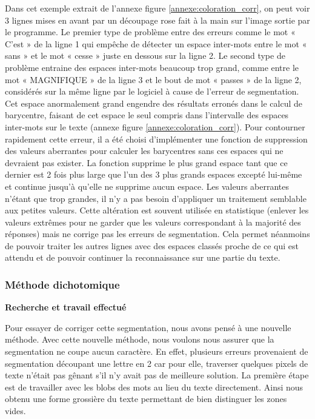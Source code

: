 \documentclass[12pt,a4paper]{article}
\begin{document}
Dans cet exemple extrait de l’annexe figure \ref{annexe:coloration_corr}, on peut voir 3 lignes mises en avant par un découpage rose fait à la main sur l’image sortie par le programme.\bigbreak
Le premier type de problème entre des erreurs comme le mot « C’est » de la ligne 1 qui empêche de détecter un espace inter-mots entre le mot « sans » et le mot « cesse » juste en dessous sur la ligne 2.\bigbreak
Le second type de problème entraine des espaces inter-mots beaucoup trop grand, comme entre le mot « MAGNIFIQUE » de la ligne 3 et le bout de mot « passes » de la ligne 2, considérés sur la même ligne par le logiciel à cause de l’erreur de segmentation.\bigbreak
Cet espace anormalement grand engendre des résultats erronés dans le calcul de barycentre, faisant de cet espace le seul compris dans l’intervalle des espaces inter-mots sur le texte (annexe figure \ref{annexe:coloration_corr}). Pour contourner rapidement cette erreur, il a été choisi d’implémenter une fonction de suppression des valeurs aberrantes pour calculer les barycentres sans ces espaces qui ne devraient pas exister. La fonction supprime le plus grand espace tant que ce dernier est 2 fois plus large que l’un des 3 plus grands espaces excepté lui-même et continue jusqu’à qu’elle ne supprime aucun espace. Les valeurs aberrantes n’étant que trop grandes, il n’y a pas besoin d’appliquer un traitement semblable aux petites valeurs.\bigbreak
Cette altération est souvent utilisée en statistique (enlever les valeurs extrêmes pour ne garder que les valeurs correspondant à la majorité des réponses) mais ne corrige pas les erreurs de segmentation. Cela permet néanmoins de pouvoir traiter les autres lignes avec des espaces classés proche de ce qui est attendu et de pouvoir continuer la reconnaissance sur une partie du texte.\bigbreak

\subsubsection{Méthode dichotomique}
\textbf{Recherche et travail effectué}\bigbreak

Pour essayer de corriger cette segmentation, nous avons pensé à une nouvelle méthode. Avec cette nouvelle méthode, nous voulons nous assurer que la segmentation ne coupe aucun caractère. En effet, plusieurs erreurs provenaient de segmentation découpant une lettre en 2 car pour elle, traverser quelques pixels de texte n’était pas gênant s’il n’y avait pas de meilleure solution. La première étape est de travailler avec les blobs des mots au lieu du texte directement. Ainsi nous obtenu une forme grossière du texte permettant de bien distinguer les zones vides.\bigbreak
\end{document}
